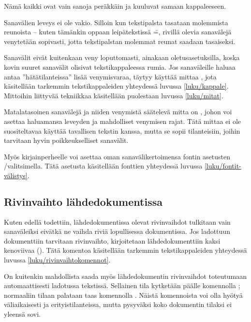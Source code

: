 \begin{tulossis}
  Nämä kaikki ovat vain sanoja peräkkäin ja kuuluvat samaan
  kappaleeseen.
\end{tulossis}

\noindent
Sanavälien leveys ei ole vakio. Silloin kun tekstipalsta tasataan
molemmista reunoista -- kuten tämänkin oppaan leipätekstissä \==,
rivillä olevia sanavälejä venytetään sopivasti, jotta tekstipalstan
molemmat reunat saadaan tasaiseksi.

Sanavälit eivät kuitenkaan veny loputtomasti, ainakaan
oletusasetuksilla, koska kovin suuret sanavälit olisivat
tekstikappaleessa rumia. Jos sanaväleille haluaa antaa
''hätätilanteissa'' lisää venymisvaraa, täytyy käyttää mittaa
, jota käsitellään tarkemmin tekstikappaleiden
yhteydessä luvussa \ref{luku/kappale}. Mittoihin liittyvää tekniikkaa
käsitellään puolestaan luvussa \ref{luku/mitat}.

Matalatasoinen sanavälejä ja niiden venymistä säätelevä mitta on
, johon voi asettaa haluamansa leveyden ja mahdolliset
venymisen rajat. Tätä mittaa ei ole suositeltavaa käyttää tavallisen
tekstin kanssa, mutta se sopii tilanteisiin, joihin tarvitaan hyvin
poikkeukselliset sanavälit.

\begin{koodilohkosis}
\setlength{\spaceskip}{0.8em plus 0.3em minus 0.2em}
\end{koodilohkosis}

\noindent
Myös kirjainperheelle voi asettaa oman sanavälikertoimensa fontin
asetusten \-/valitsimella. Tätä asetusta käsitellään
fonttien yhteydessä luvussa \ref{luku/fontit-välistys}.

\subsection{Rivinvaihto lähdedokumentissa}
\label{luku/rivinvaihtomerkit}

Kuten edellä todettiin, lähdedokumentissa olevat rivinvaihdot tulkitaan
vain sanaväleiksi eivätkä ne vaihda riviä lopullisessa dokumentissa. Jos
ladottuun dokumenttiin tarvitaan rivinvaihto, kirjoitetaan
lähdedokumenttiin kaksi kenoviivaa (\komentom{\keno}). Tätä komentoa
käsitellään tarkemmin tekstikappaleiden yhteydessä luvussa
\ref{luku/rivinvaihtokomennot}.

On kuitenkin mahdollista saada myös lähdedokumentin rivinvaihdot
toteutumaan automaattisesti ladotussa tekstissä. Sellainen tila
kytketään päälle komennolla ; normaaliin tilaan
palataan taas komennolla . Näistä komennoista voi
olla hyötyä väliaikaisesti ja erityistilanteissa, mutta pysyväksi koko
dokumentin tilaksi  ei yleensä sovi.

